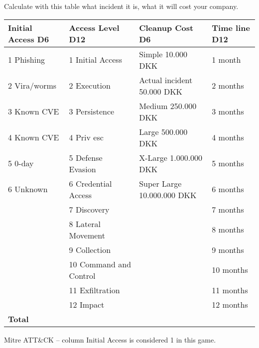 \documentclass[a4paper,11pt,notitlepage,landscape]{report}
\begin{document}
Calculate with this table what incident it is, what it will cost your company.

\begin{tabularx}{\textwidth-1cm}{|p{4cm}|X|p{7cm}|p{3cm}|} \hline
{\bf Initial Access D6} & {\bf Access Level D12} & {\bf Cleanup Cost D6} & {\bf Time line D12} \\\hline
1 Phishing   & 1 Initial Access & Simple 10.000 DKK & 1 month\\\hline
2 Vira/worms & 2 Execution & Actual incident 50.000 DKK &2 months\\\hline
3 Known CVE  & 3 Persistence & Medium 250.000 DKK & 3 months\\\hline
4 Known CVE  & 4 Priv esc & Large 500.000 DKK &4 months\\\hline
5 0-day      & 5 Defense Evasion & X-Large 1.000.000 DKK & 5 months\\\hline
6 Unknown    & 6 Credential Access & Super Large 10.000.000 DKK & 6 months\\\hline
             & 7 Discovery & & 7 months \\\hline
             & 8 Lateral Movement & & 8 months \\\hline
             & 9 Collection & & 9 months \\\hline
             & 10 Command and Control & & 10 months\\\hline
             & 11 Exfiltration & & 11 months\\\hline
             & 12 Impact & & 12 months \\\hline
{\bf Total} & & \\\hline
\end{tabularx}

Mitre ATT\&CK  -- column Initial Access is considered 1 in this game.
\end{document}
